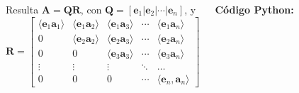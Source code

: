 \documentclass[9pt, aspectratio=169]{beamer}
\begin{document}
\begin{frame}[fragile]
	\begin{columns}[t]
		Resulta $\bm{A} = \bm{Q} \bm{R}$, con $\bm{Q} = [\bm{e}_1 | \bm{e}_2 | \cdots | \bm{e}_n]$, y
		\[ \bm{R} =
			\begin{bmatrix} \langle \bm{e}_1 \bm{a}_1 \rangle & \langle \bm{e}_1 \bm{a}_2 \rangle & \langle \bm{e}_1 \bm{a}_3 \rangle & \cdots & \langle \bm{e}_1 \bm{a}_n \rangle  \\
			                0                                 & \langle \bm{e}_2 \bm{a}_2 \rangle & \langle \bm{e}_2 \bm{a}_3 \rangle & \cdots & \langle \bm{e}_2 \bm{a}_n \rangle  \\
			                0                                 & 0                                 & \langle \bm{e}_3 \bm{a}_3 \rangle & \cdots & \langle \bm{e}_3 \bm{a}_n \rangle  \\
			                \vdots                            & \vdots                            & \vdots                            & \ddots & \ldots                             \\
			                0                                 & 0                                 & 0                                 & \cdots & \langle \bm{e}_n, \bm{a}_n \rangle\end{bmatrix} \] \pause

		\vspace{1em}
		\textbf{Código Python:}


	\end{columns}
\end{frame}
\end{document}
